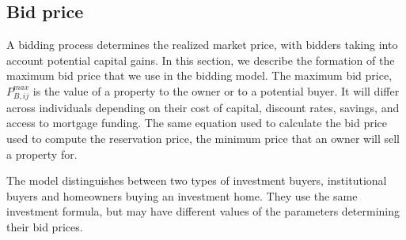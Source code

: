 {%




\subsection{Bid price}\label{sec:bid-price}
A bidding process determines the realized market price, with bidders taking into account potential capital gains. In this section, we describe the formation of the maximum bid price that we use in the bidding model. The maximum \gls{bid price}, $P_{B,ij}^{max}$ %
is the value of a property to the owner or to a potential buyer. It will differ across individuals depending on their cost of capital, discount rates,  savings, and access to mortgage funding. The same equation used to calculate the bid price used to compute the \gls{reservation price}, the minimum price that an owner will sell a property for. 

The model distinguishes between two types of investment buyers, institutional buyers and homeowners buying an investment home. They use the same investment formula, but may have different values of the parameters determining their bid prices.

}
